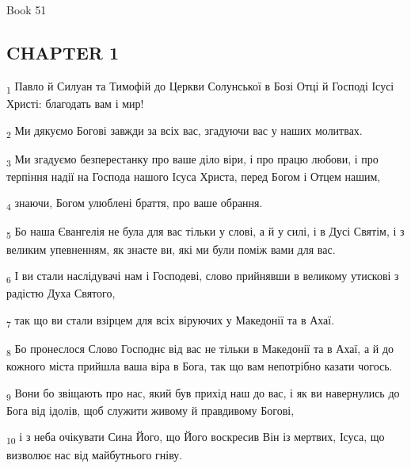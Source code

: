 Book 51
\subsection{CHAPTER 1}
\begin{tcolorbox}
\textsubscript{1} Павло й Силуан та Тимофій до Церкви Солунської в Бозі Отці й Господі Ісусі Христі: благодать вам і мир!
\end{tcolorbox}
\begin{tcolorbox}
\textsubscript{2} Ми дякуємо Богові завжди за всіх вас, згадуючи вас у наших молитвах.
\end{tcolorbox}
\begin{tcolorbox}
\textsubscript{3} Ми згадуємо безперестанку про ваше діло віри, і про працю любови, і про терпіння надії на Господа нашого Ісуса Христа, перед Богом і Отцем нашим,
\end{tcolorbox}
\begin{tcolorbox}
\textsubscript{4} знаючи, Богом улюблені браття, про ваше обрання.
\end{tcolorbox}
\begin{tcolorbox}
\textsubscript{5} Бо наша Євангелія не була для вас тільки у слові, а й у силі, і в Дусі Святім, і з великим упевненням, як знаєте ви, які ми були поміж вами для вас.
\end{tcolorbox}
\begin{tcolorbox}
\textsubscript{6} І ви стали наслідувачі нам і Господеві, слово прийнявши в великому утискові з радістю Духа Святого,
\end{tcolorbox}
\begin{tcolorbox}
\textsubscript{7} так що ви стали взірцем для всіх віруючих у Македонії та в Ахаї.
\end{tcolorbox}
\begin{tcolorbox}
\textsubscript{8} Бо пронеслося Слово Господнє від вас не тільки в Македонії та в Ахаї, а й до кожного міста прийшла ваша віра в Бога, так що вам непотрібно казати чогось.
\end{tcolorbox}
\begin{tcolorbox}
\textsubscript{9} Вони бо звіщають про нас, який був прихід наш до вас, і як ви навернулись до Бога від ідолів, щоб служити живому й правдивому Богові,
\end{tcolorbox}
\begin{tcolorbox}
\textsubscript{10} і з неба очікувати Сина Його, що Його воскресив Він із мертвих, Ісуса, що визволює нас від майбутнього гніву.
\end{tcolorbox}
